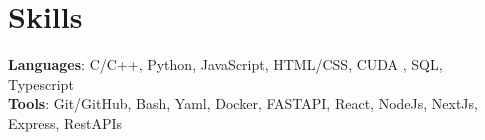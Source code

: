 
\section{Skills}
 \begin{itemize}[leftmargin=0.15in, label={}]
    \small{\item{
    
     \textbf{Languages}{: C/C++, Python, JavaScript, HTML/CSS, CUDA , SQL, Typescript} \\
     
     \textbf{Tools}{: Git/GitHub, Bash, Yaml, Docker, FASTAPI, React, NodeJs, NextJs, Express, RestAPIs}
     
     
    }}
 \end{itemize}


